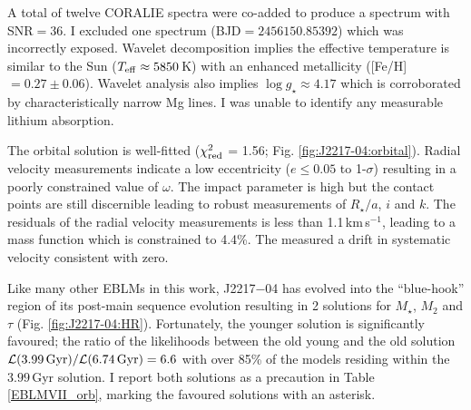 A total of twelve CORALIE spectra were co-added to produce a spectrum with SNR$=36$. I excluded one spectrum (BJD$= 2456150.85392$) which was incorrectly exposed. Wavelet decomposition implies the effective temperature is similar to the Sun ($T_{\rm eff} \approx 5850$\,K) with an enhanced metallicity ([Fe/H]$ = 0.27 \pm 0.06$). Wavelet analysis also implies $\log g_\star \approx 4.17$ which is corroborated by characteristically narrow Mg lines. I was unable to identify any measurable lithium absorption.  

The orbital solution is well-fitted ($\chi^2_{\rm red}$ = 1.56; Fig. \ref{fig:J2217-04:orbital}). Radial velocity measurements indicate a low eccentricity ($e\leq 0.05$ to 1-$\sigma$) resulting in a poorly constrained value of $\omega$. The impact parameter is high but the contact points are still discernible leading to robust measurements of $R_\star / a$, $i$ and $k$. The residuals of the radial velocity measurements is less than  1.1\,km\,s$^{-1}$, leading to a mass function which is constrained to 4.4\%. The measured a drift in systematic velocity consistent with zero. 

Like many other EBLMs in this work, J2217$-$04 has evolved into the ``blue-hook'' region of its post-main sequence evolution resulting in 2 solutions for $M_\star$, $M_2$ and $\tau$ (Fig. \ref{fig:J2217-04:HR}). Fortunately, the younger solution is significantly favoured; the ratio of the likelihoods between the old young and the old solution $\mathcal{L}(3.99\, \rm Gyr) /  \mathcal{L}(6.74\, \rm Gyr) = 6.6$ with over 85\% of the models residing within the $3.99$\,Gyr solution. I report both solutions as a precaution in Table \ref{EBLMVII_orb}, marking the favoured solutions with an asterisk. 